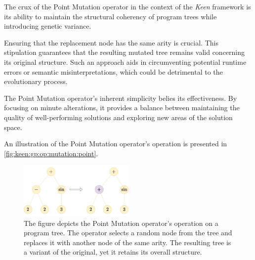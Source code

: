   The crux of the Point Mutation operator in the context of the \textit{Keen} 
  framework is its ability to maintain the structural coherency of program 
  trees while introducing genetic variance. 

  \begin{remark}
    Ensuring that the replacement node has the same arity is crucial. This 
    stipulation guarantees that the resulting mutated tree remains valid 
    concerning its original structure. Such an approach aids in circumventing 
    potential runtime errors or semantic misinterpretations, which could be 
    detrimental to the evolutionary process.
  \end{remark}

  The Point Mutation operator's inherent simplicity belies its effectiveness. By 
  focusing on minute alterations, it provides a balance between maintaining the 
  quality of well-performing solutions and exploring new areas of the solution 
  space.

  An illustration of the Point Mutation operator's operation is presented in
  \vref{fig:keen:gp:op:mutation:point}.

  \begin{figure}[ht!]
    \centering
    \includegraphics[width=0.5\textwidth]{img/keen/Point mutation.png}
    \caption{
      The figure depicts the Point Mutation operator's operation on a program 
      tree. The operator selects a random node from the tree and replaces it 
      with another node of the same arity. The resulting tree is a variant of 
      the original, yet it retains its overall structure.
    }
    \label{fig:keen:gp:op:mutation:point}
  \end{figure}
  